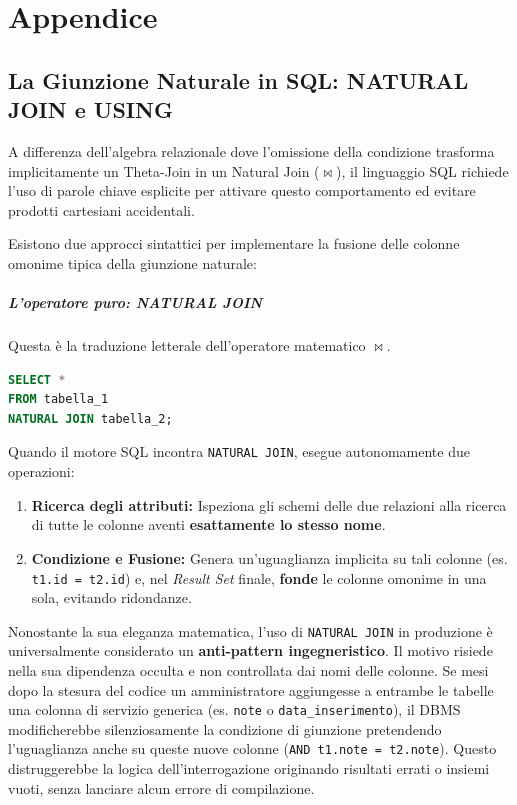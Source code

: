 \chapter{Appendice}

\section{La Giunzione Naturale in SQL: NATURAL JOIN e USING}

A differenza dell'algebra relazionale dove l'omissione della condizione trasforma implicitamente un Theta-Join in un Natural Join ($\bowtie$), il linguaggio SQL richiede l'uso di parole chiave esplicite per attivare questo comportamento ed evitare prodotti cartesiani accidentali.

Esistono due approcci sintattici per implementare la fusione delle colonne omonime tipica della giunzione naturale:

\paragraph{L'operatore puro: NATURAL JOIN}
Questa è la traduzione letterale dell'operatore matematico $\bowtie$.

\begin{lstlisting}[language=SQL, basicstyle=\ttfamily\small, keywordstyle=\color{blue}\bfseries]
SELECT *
FROM tabella_1
NATURAL JOIN tabella_2;
\end{lstlisting}

Quando il motore SQL incontra \texttt{NATURAL JOIN}, esegue autonomamente due operazioni:
\begin{enumerate}
    \item \textbf{Ricerca degli attributi:} Ispeziona gli schemi delle due relazioni alla ricerca di tutte le colonne aventi \textbf{esattamente lo stesso nome}.
    \item \textbf{Condizione e Fusione:} Genera un'uguaglianza implicita su tali colonne (es. \texttt{t1.id = t2.id}) e, nel \textit{Result Set} finale, \textbf{fonde} le colonne omonime in una sola, evitando ridondanze.
\end{enumerate}

\begin{warningbox}
Nonostante la sua eleganza matematica, l'uso di \texttt{NATURAL JOIN} in produzione è universalmente considerato un \textbf{anti-pattern ingegneristico}. 
Il motivo risiede nella sua dipendenza occulta e non controllata dai nomi delle colonne. Se mesi dopo la stesura del codice un amministratore aggiungesse a entrambe le tabelle una colonna di servizio generica (es. \texttt{note} o \texttt{data\_inserimento}), il DBMS modificherebbe silenziosamente la condizione di giunzione pretendendo l'uguaglianza anche su queste nuove colonne (\texttt{AND t1.note = t2.note}). Questo distruggerebbe la logica dell'interrogazione originando risultati errati o insiemi vuoti, senza lanciare alcun errore di compilazione.
\end{warningbox}

